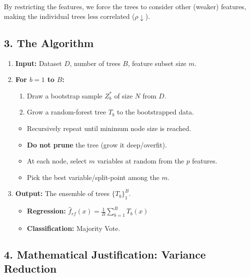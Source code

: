 \documentclass[
  italian,
  11pt,
]{article}
\begin{document}
By restricting the features, we force the trees to consider other
(weaker) features, making the individual trees less correlated
(\(\rho \downarrow\)).

\subsection{3. The Algorithm}\label{the-algorithm-3}

\begin{enumerate}
\def\labelenumi{\arabic{enumi}.}
\item
  \textbf{Input:} Dataset \(D\), number of trees \(B\), feature subset
  size \(m\).
\item
  \textbf{For \(b = 1\) to \(B\):}

  \begin{enumerate}
  \def\labelenumii{\alph{enumii}.}
  \item
    Draw a bootstrap sample \(Z^*_b\) of size \(N\) from \(D\).
  \item
    Grow a random-forest tree \(T_b\) to the bootstrapped data.
  \end{enumerate}

  \begin{itemize}
  \item
    Recursively repeat until minimum node size is reached.
  \item
    \textbf{Do not prune} the tree (grow it deep/overfit).
  \item
    At each node, select \(m\) variables at random from the \(p\)
    features.
  \item
    Pick the best variable/split-point among the \(m\).
  \end{itemize}
\item
  \textbf{Output:} The ensemble of trees \(\{T_b\}_1^B\).

  \begin{itemize}
  \item
    \textbf{Regression:}
    \(\hat{f}_{rf}(x) = \frac{1}{B} \sum_{b=1}^{B} T_b(x)\)
  \item
    \textbf{Classification:} Majority Vote.
  \end{itemize}
\end{enumerate}

\subsection{4. Mathematical Justification: Variance
Reduction}\label{mathematical-justification-variance-reduction}
\end{document}

